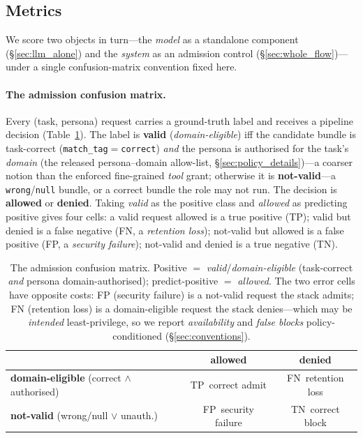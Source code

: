 \documentclass[sigconf,review,anonymous]{acmart}
\begin{document}
\subsection{Metrics}
\label{sec:security_metrics}
\label{sec:conventions}
\label{sec:eval_metrics}

We score two objects in turn---the \emph{model} as a standalone component (\S\ref{sec:llm_alone}) and the \emph{system} as an admission control (\S\ref{sec:whole_flow})---under a single confusion-matrix convention fixed here.

\paragraph{The admission confusion matrix.} Every (task, persona) request carries a ground-truth label and receives a pipeline decision (Table~\ref{tab:confusion}). The label is \textbf{valid} (\emph{domain-eligible}) iff the candidate bundle is task-correct (\texttt{match\_tag}$=$\texttt{correct}) \emph{and} the persona is authorised for the task's \emph{domain} (the released persona--domain allow-list, \S\ref{sec:policy_details})---a coarser notion than the enforced fine-grained \emph{tool} grant; otherwise it is \textbf{not-valid}---a \texttt{wrong}/\texttt{null} bundle, or a correct bundle the role may not run. The decision is \textbf{allowed} or \textbf{denied}. Taking \emph{valid} as the positive class and \emph{allowed} as predicting positive gives four cells: a valid request allowed is a true positive (TP); valid but denied is a false negative (FN, a \emph{retention loss}); not-valid but allowed is a false positive (FP, a \emph{security failure}); not-valid and denied is a true negative (TN).

\begin{table}[!t]
\centering
\caption{The admission confusion matrix. Positive $=$ \emph{valid}/\emph{domain-eligible} (task-correct \emph{and} persona domain-authorised); predict-positive $=$ \emph{allowed}. The two error cells have opposite costs: FP (security failure) is a not-valid request the stack admits; FN (retention loss) is a domain-eligible request the stack denies---which may be \emph{intended} least-privilege, so we report \emph{availability} and \emph{false blocks} policy-conditioned (\S\ref{sec:conventions}).}
\label{tab:confusion}
\footnotesize
\setlength{\tabcolsep}{6pt}
\begin{tabular}{@{}lcc@{}}
\toprule
 & \textbf{allowed} & \textbf{denied} \\
\midrule
\textbf{domain-eligible} (correct $\wedge$ authorised)     & TP\, correct admit    & FN\, retention loss \\
\textbf{not-valid} (wrong/null $\vee$ unauth.)    & FP\, security failure & TN\, correct block \\
\bottomrule
\end{tabular}
\end{table}
\end{document}
